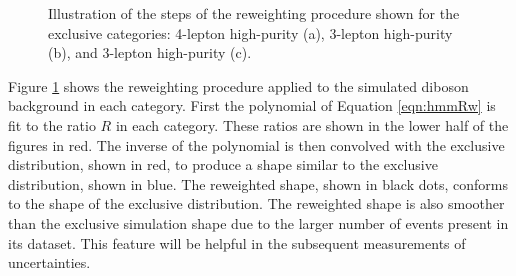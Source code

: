 \begin{figure}[h!]
\captionsetup[subfigure]{position=b}
\centering
{}
\caption{Illustration of the steps of the reweighting procedure shown for the exclusive categories: 4-lepton high-purity (a), 3-lepton high-purity (b), and 3-lepton high-purity (c).}
\label{fig:hmmRw}
\end{figure}

Figure \ref{fig:hmmRw} shows the reweighting procedure applied to the simulated diboson background in each category.
First the polynomial of Equation \ref{eqn:hmmRw} is fit to the ratio $R$ in each category.
These ratios are shown in the lower half of the figures in red.
The inverse of the polynomial is then convolved with the exclusive distribution, shown in red, to produce a shape similar to the exclusive distribution, shown in blue.
The reweighted shape, shown in black dots, conforms to the shape of the exclusive distribution.
The reweighted shape is also smoother than the exclusive simulation shape due to the larger number of events present in its dataset.
This feature will be helpful in the subsequent measurements of uncertainties.

